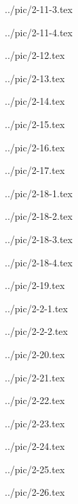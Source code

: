 ../pic/2-11-3.tex



../pic/2-11-4.tex



../pic/2-12.tex



../pic/2-13.tex



../pic/2-14.tex



../pic/2-15.tex



../pic/2-16.tex



../pic/2-17.tex



../pic/2-18-1.tex



../pic/2-18-2.tex



../pic/2-18-3.tex



../pic/2-18-4.tex



../pic/2-19.tex



../pic/2-2-1.tex



../pic/2-2-2.tex



../pic/2-20.tex



../pic/2-21.tex



../pic/2-22.tex



../pic/2-23.tex



../pic/2-24.tex



../pic/2-25.tex



../pic/2-26.tex

